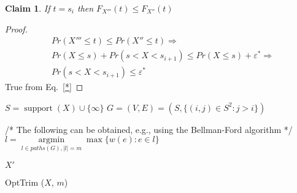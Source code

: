 \documentclass[review]{elsarticle}
\newtheorem{claim}{Claim}
\DeclareMathOperator{\support}{support}
\begin{document}
\begin{claim}\label{partGMin}
If $t=s_i$ then $F_{X'''}(t) \leq F_{X''}(t)$
\end{claim}
\begin{proof}
\begin{align*}
&Pr(X''' \leq t) \leq Pr(X''\leq t) \Rightarrow\\
&Pr(X\leq s) + Pr(s<X< s_{i+1}) \leq Pr(X\leq s) + \varepsilon^* \Rightarrow\\
&Pr(s<X< s_{i+1})\leq \varepsilon^*
\end{align*}
True from Eq.~\ref{*}

\end{proof}

%
%  
%     


\begin{algorithm}
	\DontPrintSemicolon
	$S = \support(X)\cup \{\infty\}$\;
	$G=(V,E)=(S, \{ (i,j) \in S^2 \colon  j>i \})$ \;
	

	/* The following can be obtained, e.g., using the Bellman-Ford algorithm */\;
	$l= \operatorname{argmin}\limits_{l \in paths(G),|l|=m}  \max \{ w(e)\colon e \in l  \}$ \;
	

	\Return $X'$\;
	
	\caption{OptTrim ($X$, $m$)}  
	\label{alg:sequence}
\end{algorithm}
\end{document}
